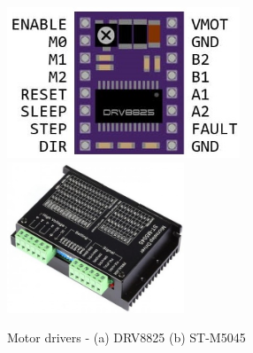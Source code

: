 \begin{figure}[H]
    \begin{center}
        \includegraphics[height=4.5cm]{images/drv8825 pinmap.jpg}
        \includegraphics[height=4.5cm]{images/st-m5045.jpg}
    \end{center}
        \caption{Motor drivers - (a) DRV8825 (b) ST-M5045}
        \label{Circuit - PCB, Schematic}
\end{figure}

